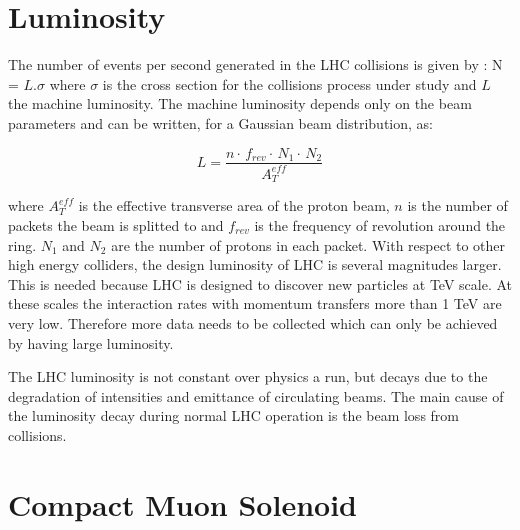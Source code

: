 \section{Luminosity}
The number of events per second generated in the LHC collisions is given by :
N = $L.\sigma$
where $\sigma$ is the cross section for the collisions process under study and $L$ the
machine luminosity. The machine luminosity depends only on the beam parameters and can be written, 
for a Gaussian beam distribution, as:



\begin{equation}
\label{eq:Lumi}
L = \frac{n \cdot \,f_{rev}\cdot \,N_{1} \cdot \, N_{2}}{A^{eff}_T}
\end{equation}

where $A^{eff}_T$ is the effective transverse area of the proton beam, $n$ is the number of packets
the beam is splitted to and $f_{rev}$ is the frequency of revolution around the ring. $N_{1}$ and $N_{2}$ are
the number of protons in each packet. With respect to other high energy colliders, the design
luminosity of LHC is several magnitudes larger. This is needed because LHC is designed
to discover new particles at TeV scale. At these scales the interaction rates with momentum
transfers more than 1 TeV are very low. Therefore more data needs to be collected which can
only be achieved by having large luminosity.


The LHC luminosity is not constant over physics a run, but decays due to the
degradation of intensities and emittance of circulating beams. The main cause
of the luminosity decay during normal LHC operation is the beam loss from
collisions.

\section{Compact Muon Solenoid}

